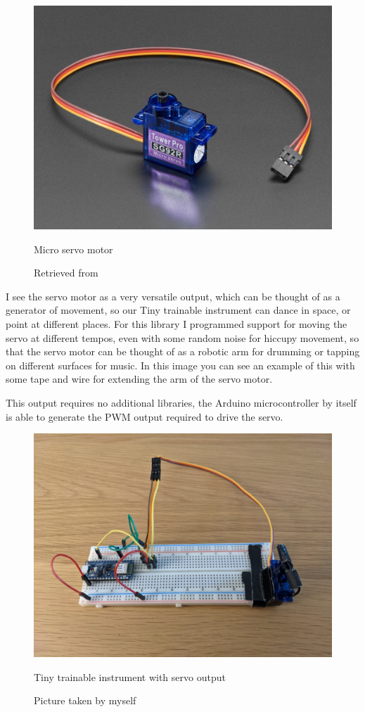 \begin{figure}[ht]
  \centering
  \includegraphics[width=0.75\linewidth,height=0.25\textheight,keepaspectratio]{images/materials-adafruit-servo.jpg}
  \caption{Micro servo motor}
  \caption*{Retrieved from \cite{website-materials-adafruit-servo}}
  \label{fig:materials-adafruit-servo}
\end{figure}

I see the servo motor as a very versatile output, which can be thought of as a generator of movement, so our Tiny trainable instrument can dance in space, or point at different places. For this library I programmed support for moving the servo at different tempos, even with some random noise for hiccupy movement, so that the servo motor can be thought of as a robotic arm for drumming or tapping on different surfaces for music. In this image you can see an example of this with some tape and wire for extending the arm of the servo motor.

This output requires no additional libraries, the Arduino microcontroller by itself is able to generate the \acrfull{PWM} output required to drive the servo.

\begin{figure}[ht]
  \centering
  \includegraphics[width=0.75\linewidth,height=0.25\textheight,keepaspectratio]{images/output-servo.jpg}
  \caption{Tiny trainable instrument with servo output}
  \caption*{Picture taken by myself}
  \label{fig:output-servo}
\end{figure}

